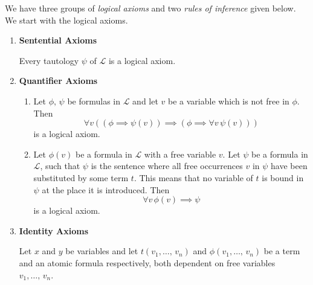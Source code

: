 \documentclass[../../main.tex]{subfiles}
\begin{document}
\begin{definition}
    We have three groups of \textit{logical axioms} and two \textit{rules of inference} given below.
    We start with the logical axioms.
    \begin{enumerate}
        \item \textbf{Sentential Axioms}
        
        Every tautology $\psi$ of $\mathcal{L}$ is a logical axiom. %
        \item \textbf{Quantifier Axioms}
        \begin{enumerate}
            \item Let $\phi,\, \psi$ be formulas in $\mathcal{L}$ and let $v$ be a variable which is not free in $\phi$.
            Then
            $$\forall v \left((\phi \implies \psi(v)) \implies (\phi \implies \forall v\, \psi(v))\right)$$
            is a logical axiom.
            \item Let $\phi(v)$ be a formula in $\mathcal{L}$ with a free variable $v$.
            Let $\psi$ be a formula in $\mathcal{L}$, 
            such that $\psi$ is the sentence where all free occurrences $v$ in $\psi$ have been substituted by some term $t$.
            This means that no variable of $t$ is bound in $\psi$ at the place it is introduced.
            Then 
            $$\forall v \, \phi(v) \implies \psi$$
            is a logical axiom.
        \end{enumerate}
        \item \textbf{Identity Axioms}
        
        Let $x$ and $y$ be variables and let $t(v_1,\ldots,\, v_n)$ and $\phi(v_1,\ldots,\, v_n)$ be a term and an atomic formula respectively,
        both dependent on free variables $v_1,\ldots,\, v_n$.


\end{enumerate}
\end{definition}
\end{document}
